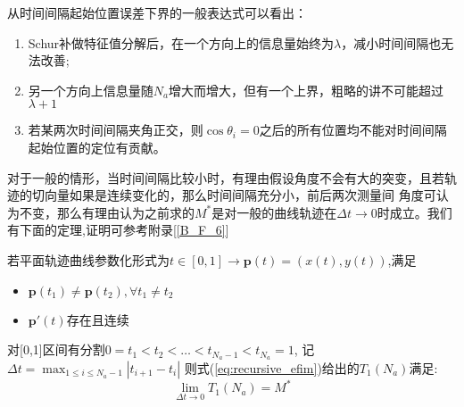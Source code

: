 从时间间隔起始位置误差下界的一般表达式可以看出：
\begin{enumerate}
  \item Schur补做特征值分解后，在一个方向上的信息量始终为$\lambda$，减小时间间隔也无法改善;
  \item 另一个方向上信息量随$N_a$增大而增大，但有一个上界，粗略的讲不可能超过$\lambda+1$
  \item 若某两次时间间隔夹角正交，则$\cos\theta_i=0$之后的所有位置均不能对时间间隔起始位置的定位有贡献。
\end{enumerate}
对于一般的情形，当时间间隔比较小时，有理由假设角度不会有大的突变，且若轨迹的切向量如果是连续变化的，那么时间间隔充分小，前后两次测量间
角度可认为不变，那么有理由认为之前求的$M^*$是对一般的曲线轨迹在$\Delta t\to 0$时成立。我们有下面的定理,证明可参考附录[\ref{B_F_6}]
\begin{theorem}\label{theorem:arbitrary_curve}
若平面轨迹曲线参数化形式为$t\in[0,1]\rightarrow \bm{p}(t)=(x(t),y(t))$,满足
\begin{itemize}
\item $\bm{p}(t_1)\neq \bm{p}(t_2),\forall t_1\neq t_2$
\item $\bm{p}'(t)$存在且连续
\end{itemize}
对[0,1]区间有分割$0=t_1<t_2<\dots<t_{N_a-1}<t_{N_a}=1$,
记$\Delta t=\max_{1\leq i\leq N_a-1}|t_{i+1}-t_i|$
则式(\ref{eq:recursive_efim})给出的$T_1(N_a)$满足:
\begin{equation}\label{eq:limiting_cf}
\lim_{\Delta t\to 0}T_1(N_a)=M^*
\end{equation}
\end{theorem}

